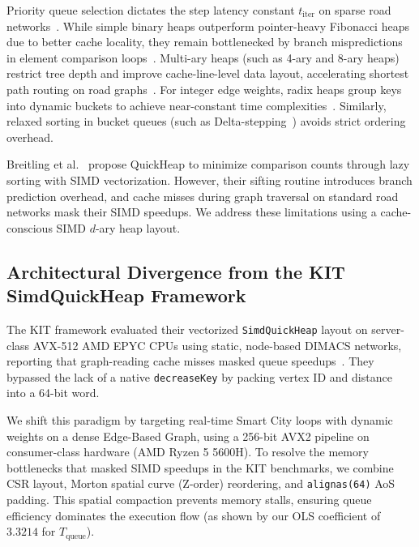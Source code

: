Priority queue selection dictates the step latency constant $t_{\text{iter}}$ on sparse road networks~\cite{cherkassky1994shortest}. 
While simple binary heaps outperform pointer-heavy Fibonacci heaps due to better cache locality, they remain bottlenecked by branch mispredictions in element comparison loops~\cite{biggar_sorting}. 
Multi-ary heaps (such as 4-ary and 8-ary heaps) restrict tree depth and improve cache-line-level data layout, accelerating shortest path routing on road graphs~\cite{outerloop_heap}. 
For integer edge weights, radix heaps group keys into dynamic buckets to achieve near-constant time complexities~\cite{ahuja1990faster}. 
Similarly, relaxed sorting in bucket queues (such as Delta-stepping~\cite{meyer2003delta}) avoids strict ordering overhead. 

Breitling et al.~\cite{quickheap_arxiv} propose QuickHeap to minimize comparison counts through lazy sorting with SIMD vectorization. 
However, their sifting routine introduces branch prediction overhead, and cache misses during graph traversal on standard road networks mask their SIMD speedups. 
We address these limitations using a cache-conscious SIMD $d$-ary heap layout.

\subsection{Architectural Divergence from the KIT SimdQuickHeap Framework}
The KIT framework evaluated their vectorized \texttt{SimdQuickHeap} layout on server-class AVX-512 AMD EPYC CPUs using static, node-based DIMACS networks, reporting that graph-reading cache misses masked queue speedups~\cite{quickheap_arxiv}. They bypassed the lack of a native \texttt{decreaseKey} by packing vertex ID and distance into a 64-bit word. 

We shift this paradigm by targeting real-time Smart City loops with dynamic weights on a dense Edge-Based Graph, using a 256-bit AVX2 pipeline on consumer-class hardware (AMD Ryzen 5 5600H). To resolve the memory bottlenecks that masked SIMD speedups in the KIT benchmarks, we combine CSR layout, Morton spatial curve (Z-order) reordering, and \texttt{alignas(64)} AoS padding. This spatial compaction prevents memory stalls, ensuring queue efficiency dominates the execution flow (as shown by our OLS coefficient of $3.3214$ for $T_{\text{queue}}$).
